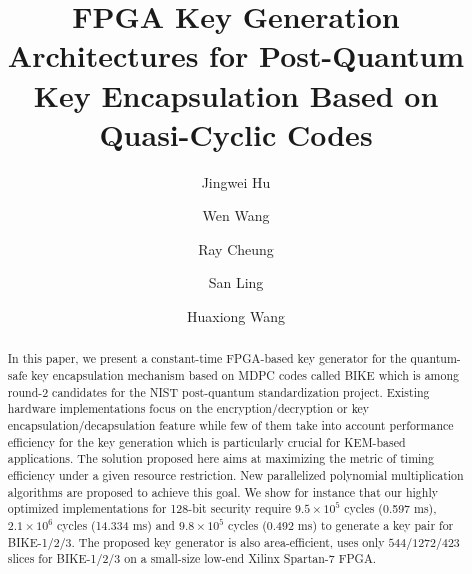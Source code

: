 \documentclass[runningheads]{llncs}
\begin{document}
%
\title{FPGA Key Generation Architectures for Post-Quantum Key Encapsulation Based on Quasi-Cyclic Codes}
%
%
\author{Jingwei Hu \and Wen Wang \and Ray Cheung \and San Ling \and Huaxiong Wang}



%


%
\maketitle              %
%


\begin{abstract}
  In this paper, we present a constant-time FPGA-based key generator for the
quantum-safe key encapsulation mechanism based on MDPC codes called BIKE which is among round-2 candidates for the NIST post-quantum standardization project. Existing hardware implementations
focus on the encryption/decryption or key encapsulation/decapsulation feature while few of them take into account
performance efficiency for the key generation which is particularly crucial for
KEM-based applications. The solution proposed here
aims at maximizing the metric of timing efficiency under a given resource restriction. New
parallelized polynomial multiplication algorithms are proposed to achieve this goal.
We show for instance that our highly optimized implementations for 128-bit security require $9.5\times 10^5$ cycles (0.597 ms), $2.1\times 10^6$ cycles (14.334 ms) and $9.8\times 10^5$ cycles (0.492 ms) to generate a key pair for BIKE-1/2/3. The proposed key generator is also area-efficient, uses only $544/1272/423$ slices for BIKE-1/2/3 on a small-size low-end Xilinx Spartan-7 FPGA.

\end{abstract}
%
%
%
\end{document}

